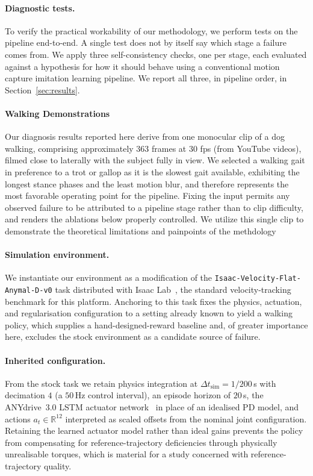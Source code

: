 \documentclass{article}
\theoremstyle{plain}
\theoremstyle{definition}
\theoremstyle{remark}
\begin{document}
\paragraph{Diagnostic tests.} To verify the practical workability of our methodology, we perform tests on the pipeline end-to-end. A single test does not by itself say which stage a failure comes
from. We apply three self-consistency checks, one per stage, each evaluated against a hypothesis for how it should behave using a conventional motion capture imitation learning pipeline. We report all three, in pipeline order, in Section~\ref{sec:results}. 
 
\paragraph{Walking Demonstrations} Our diagnosis results reported here derive 
from one monocular clip of a dog walking, comprising approximately 363 frames 
at 30 fps (from YouTube videos), filmed close to laterally with the subject fully in view.
We selected a walking gait in preference to a trot or gallop as it is the
slowest gait available, exhibiting the longest stance phases and the least
motion blur, and therefore represents the most favorable operating point for
the pipeline. Fixing the input permits any observed failure to be attributed
to a pipeline stage rather than to clip difficulty, and renders the ablations
below properly controlled. We utilize this single clip to demonstrate the 
theoretical limitations and painpoints of the methdology
 
\paragraph{Simulation environment.} We instantiate our environment as a
modification of the \texttt{Isaac-Velocity-Flat-Anymal-D-v0} task distributed
with Isaac Lab~\citep{mittal2023orbit}, the standard velocity-tracking
benchmark for this platform. Anchoring to this task fixes the physics,
actuation, and regularisation configuration to a setting already known to
yield a walking policy, which supplies a hand-designed-reward baseline and, of
greater importance here, excludes the stock environment as a candidate source
of failure.
 
\paragraph{Inherited configuration.} From the stock task we retain physics
integration at $\Delta t_{\text{sim}} = 1/200$\,s with decimation $4$
(a $50$\,Hz control interval), an episode horizon of $20$\,s, the ANYdrive~3.0
LSTM actuator network~\citep{hwangbo2019learning, rudin2022learning} in place
of an idealised PD model, and actions $a_t \in \mathbb{R}^{12}$ interpreted as
scaled offsets from the nominal joint configuration. Retaining the learned
actuator model rather than ideal gains prevents the policy from compensating
for reference-trajectory deficiencies through physically unrealisable torques,
which is material for a study concerned with reference-trajectory quality.
 
\end{document}
